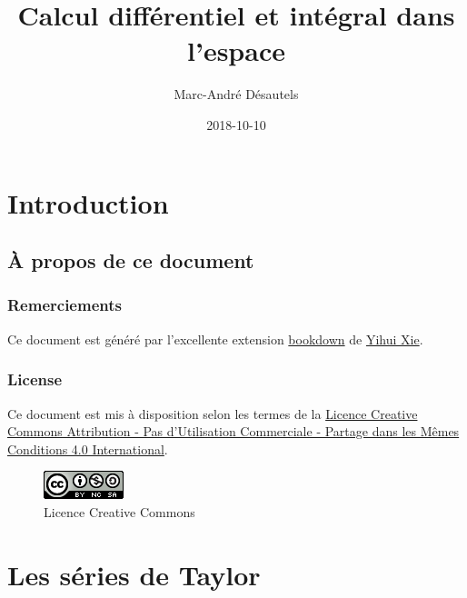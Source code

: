 \documentclass[]{book}
\title{Calcul différentiel et intégral dans l'espace}
\author{Marc-André Désautels}
\date{2018-10-10}
\theoremstyle{definition}
\theoremstyle{definition}
\theoremstyle{definition}
\theoremstyle{remark}
\begin{document}
\maketitle

{
\setcounter{tocdepth}{2}
\tableofcontents
}
\hypertarget{introduction}{%
\chapter*{Introduction}\label{introduction}}

\hypertarget{a-propos-de-ce-document}{%
\section*{À propos de ce document}\label{a-propos-de-ce-document}}

\hypertarget{remerciements}{%
\subsection*{Remerciements}\label{remerciements}}

Ce document est généré par l'excellente extension
\href{https://bookdown.org/}{bookdown} de
\href{https://yihui.name/}{Yihui Xie}.

\hypertarget{license}{%
\subsection*{License}\label{license}}

Ce document est mis à disposition selon les termes de la
\href{http://creativecommons.org/licenses/by-nc-sa/4.0/}{Licence
Creative Commons Attribution - Pas d'Utilisation Commerciale - Partage
dans les Mêmes Conditions 4.0 International}.

\begin{figure}
\centering
\includegraphics{resources/icons/license_cc.png}
\caption{Licence Creative Commons}
\end{figure}

\hypertarget{taylor}{%
\chapter{Les séries de Taylor}\label{taylor}}
\end{document}
